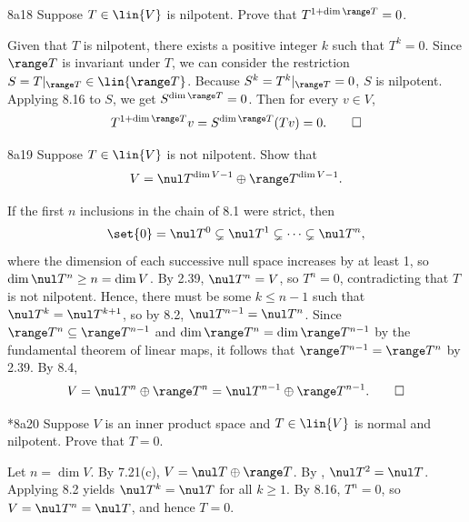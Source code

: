 \begin{exercise}{8a18}
    Suppose $T \in \lin{V}$ is nilpotent.
    Prove that $T^{1 + \dim \range T} = 0$.

\end{exercise}

\begin{sol}
    Given that $T$ is nilpotent, there exists a positive integer $k$ such that $T^k = 0$.
    Since $\range T$ is invariant under $T$, we can consider the restriction $S = T|_{\range T} \in \lin{\range T}$.
    Because $S^k = T^k|_{\range T} = 0$, $S$ is nilpotent.
    Applying 8.16 to $S$, we get $S^{\dim \range T} = 0$.
    Then for every $v \in V$,
    \[
        T^{1 + \dim \range T} v = S^{\dim \range T} (T v) = 0. \qedhere
    \]
\end{sol}

\begin{exercise}{8a19}
    Suppose $T \in \lin{V}$ is not nilpotent.
    Show that
    \[
        V = \nul T^{\dim V - 1} \oplus \range T^{\dim V - 1}.
    \]
\end{exercise}

\begin{sol}
    If the first $n$ inclusions in the chain of 8.1 were strict, then
    \[
        \set{0} = \nul T^0 \subsetneq \nul T^1 \subsetneq \cdots \subsetneq \nul T^n,
    \]
    where the dimension of each successive null space increases by at least 1, so $\dim \nul T^n \geq n = \dim V$.
    By 2.39, $\nul T^n = V$, so $T^n = 0$, contradicting that $T$ is not nilpotent.
    Hence, there must be some $k \leq n-1$ such that $\nul T^k = \nul T^{k+1}$, so by 8.2, $\nul T^{n-1} = \nul T^n$.
    Since $\range T^n \subseteq \range T^{n-1}$ and $\dim \range T^n = \dim \range T^{n-1}$ by the fundamental theorem of linear maps, it follows that $\range T^{n-1} = \range T^n$ by 2.39.
    By 8.4,
    \[
        V = \nul T^n \oplus \range T^n = \nul T^{n-1} \oplus \range T^{n-1}. \qedhere
    \]
\end{sol}

\begin{exercise}*{8a20}
    Suppose $V$ is an inner product space and $T \in \lin{V}$ is normal and nilpotent.
    Prove that $T = 0$.
\end{exercise}

\begin{sol}
    Let $n = \dim V$.
    By 7.21(c), $V = \nul T \oplus \range T$.
    By , $\nul T^2 = \nul T$.
    Applying 8.2 yields $\nul T^k = \nul T$ for all $k \geq 1$.
    By 8.16, $T^n = 0$, so $V = \nul T^n = \nul T$, and hence $T = 0$.
\end{sol}

